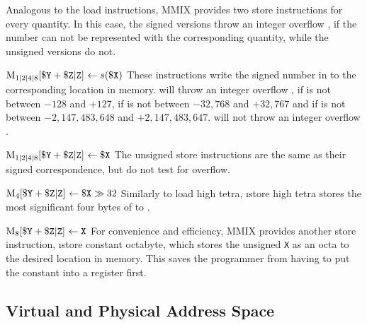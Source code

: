 Analogous to the load instructions, MMIX provides two store instructions for every quantity. In this case, the signed versions throw an integer overflow , if the number can not be represented with the corresponding quantity, while the unsigned versions do not.

\instrtbl
	{}
	{$\vmem{1|2|4|8}{\dr{Y} + \udrim{Z}}~\leftarrow s(\dr{X})$}
\noindent These instructions write the signed number in  to the corresponding location in memory.  will throw an integer overflow , if  is not between $-128$ and $+127$,  if  is not between $-32,768$ and $+32,767$ and  if  is not between $-2,147,483,648$ and $+2,147,483,647$.  will not throw an integer overflow . \citep[pg. 5]{mmix-doc}

\instrtbl
	{}
	{$\vmem{1|2|4|8}{\dr{Y} + \udrim{Z}}~\leftarrow \dr{X}$}
\noindent The unsigned store instructions are the same as their signed correspondence, but do not test for overflow. \citep[pg. 5]{mmix-doc}

\instrtbl
	{}
	{$\vmem{4}{\dr{Y} + \udrim{Z}}~\leftarrow \dr{X} \gg 32$}
\noindent Similarly to load high tetra, \i{store high tetra} stores the most significant four bytes of  to . \citep[pg. 5]{mmix-doc}

\instrtbl
	{}
	{$\vmem{8}{\dr{Y} + \udrim{Z}}~\leftarrow {\tt X}$}
\noindent For convenience and efficiency, MMIX provides another store instruction, \i{store constant octabyte}, which stores the unsigned  {\tt X} as an octa to the desired location in memory. This saves the programmer from having to put the constant into a register first. \citep[pg. 5]{mmix-doc}

\subsection{Virtual and Physical Address Space}

